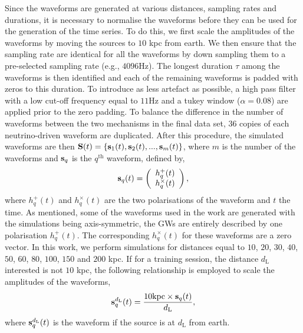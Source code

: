 \documentclass[aps,twocolumn,showpacs,groupedaddress, nofootinbib]{revtex4}  %
\begin{document}
Since the waveforms are generated at various distances, sampling rates and durations, 
it is necessary to normalise the waveforms before they can be used for the generation of the time series.
To do this, we first scale the amplitudes of the waveforms by moving the sources to $10$ kpc from earth.
We then ensure that the sampling rate are identical for all the waveforms by down sampling 
them to a pre-selected sampling rate (e.g., $4096$Hz).
The longest duration $\tau$ among the waveforms is then identified and each of the remaining waveforms is padded with zeros
to this duration.
To introduce as less artefact as possible, a high pass filter with a low cut-off frequency equal to $11$Hz 
and a tukey window ($\alpha = 0.08$) are applied prior to the zero padding. 
To balance the difference in the number of waveforms 
between the two mechanisms in the final data set, $36$ copies of each neutrino-driven waveform are duplicated.
After this procedure, the simulated 
waveforms are then $\bold{S}(t) = \{\bold{s}_{1}(t), \bold{s}_{2}(t), ..., \bold{s}_{m}(t)\}$, where $m$ is the number of the waveforms and 
$\bold{s}_{q}$ is the $q^{\text{th}}$ waveform, defined by,
\begin{equation}\label{eq:ht}
 \bold{s}_q(t) = \left(\begin{array}{c}
                        h_q^+(t) \\
                        h_q^\times(t)
                       \end{array}\right),
\end{equation}
where $h_q^+(t)$ and $h_q^\times(t)$ are the two polarisations of the waveform and $t$ the time. 
As mentioned, some of the waveforms used in the work are generated with the simulations being axis-symmetric, the \acp{GW} are entirely described by one polarisation $h_q^+(t)$. 
The corresponding $h_q^\times(t)$ for these waveforms are a zero vector. 
In this work, we perform simulations for distances equal to $10$, $20$, $30$, $40$, $50$, $60$, $80$, $100$, $150$ and $200$ kpc.
If for a training session, the distance $d_\text{L}$ interested is not $10$ kpc, the following relationship is employed to scale the amplitudes of the waveforms,
\begin{equation}\label{eq:sap}
 \bold{s}^{d_\text{L}}_q(t) =  \frac{10\text{kpc}\times\bold{s}_q(t)}{d_\text{L}},
\end{equation}
where $\bold{s}^{d_\text{L}}_q(t)$ is the waveform if the source is at $d_\text{L}$ from earth.
\end{document}
